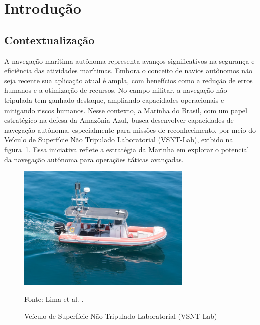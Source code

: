 \section{Introdução}

\subsection{Contextualização}

A navegação marítima autônoma representa avanços significativos na segurança e eficiência das atividades marítimas. Embora o conceito de navios autônomos não seja recente sua aplicação atual é ampla, com benefícios como a redução de erros humanos e a otimização de recursos. No campo militar, a navegação não tripulada tem ganhado destaque, ampliando capacidades operacionais e mitigando riscos humanos. Nesse contexto, a Marinha do Brasil, com um papel estratégico na defesa da Amazônia Azul, busca desenvolver capacidades de navegação autônoma, especialmente para missões de reconhecimento, por meio do Veículo de Superfície Não Tripulado Laboratorial (VSNT-Lab), exibido na figura~\ref{fig:intro_vsnt}. Essa iniciativa reflete a estratégia da Marinha em explorar o potencial da navegação autônoma para operações táticas avançadas\cite{douglas2024_VSNT}.

\begin{figure}[H]
    \caption{Veículo de Superfície Não Tripulado Laboratorial (VSNT-Lab)}
       \centering
       \includegraphics[height=6cm]{figuras/intro_vsnt.png}
       \label{fig:intro_vsnt}
   \small
   
   Fonte: Lima et al. \cite{douglas2024_VSNT}.
   \end{figure}



